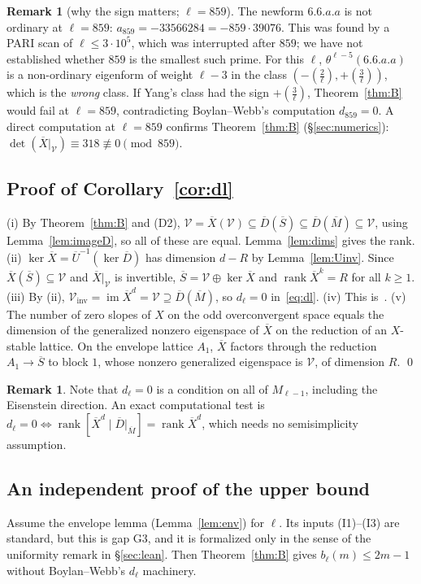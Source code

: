 \documentclass[11pt]{amsart}
\newcommand{\Sb}{\overline{S}}
\newcommand{\Mb}{\overline{M}}
\newcommand{\Ub}{\overline{U}}
\newcommand{\Db}{\overline{D}}
\newcommand{\Xb}{\overline{X}}
\newcommand{\cV}{\mathcal{V}}
\newcommand{\leg}[2]{\left(\frac{#1}{#2}\right)}
\DeclareMathOperator{\rank}{rank}
\theoremstyle{plain}
\theoremstyle{definition}
\newtheorem{remark}[theorem]{Remark}
\numberwithin{equation}{section}
\begin{document}
\begin{remark}[why the sign matters; $\ell=859$]\label{rem:859}
The newform $6.6.a.a$ is not ordinary at $\ell=859$: $a_{859}=-33566284=-859\cdot39076$. This was found by a PARI scan of
$\ell\le3\cdot10^5$, which was interrupted after $859$; we have not established whether $859$ is the smallest such prime.
For this $\ell$, $\theta^{\ell-5}(6.6.a.a)$ is a non-ordinary eigenform of weight $\ell-3$ in the class
$(-\leg2\ell,+\leg3\ell)$, which is the \emph{wrong} class. If Yang's class had the sign $+\leg3\ell$, Theorem~\ref{thm:B} would fail at
$\ell=859$, contradicting Boylan--Webb's computation $d_{859}=0$. A direct computation at $\ell=859$ confirms
Theorem~\ref{thm:B} (\S\ref{sec:numerics}): $\det(\Xb|_\cV)\equiv318\not\equiv0\pmod{859}$.
\end{remark}

\subsection{Proof of Corollary~\ref{cor:dl}}
(i) By Theorem~\ref{thm:B} and (D2), $\cV=\Xb(\cV)\subseteq\Db(\Sb)\subseteq\Db(\Mb)\subseteq\cV$, using
Lemma~\ref{lem:imageD}, so all of these are equal. Lemma~\ref{lem:dims} gives the rank.
(ii) $\ker\Xb=\Ub^{-1}(\ker\Db)$ has dimension $d-R$ by Lemma~\ref{lem:Uinv}. Since $\Xb(\Sb)\subseteq\cV$ and
$\Xb|_\cV$ is invertible, $\Sb=\cV\oplus\ker\Xb$ and $\rank\Xb^k=R$ for all $k\ge1$.
(iii) By (ii), $\cV_{\mathrm{inv}}=\operatorname{im}\Xb^d=\cV\supseteq\Db(\Mb)$, so $d_\ell=0$ in~\eqref{eq:dl}.
(iv) This is~\cite[Thm.~1.2]{BoylanWebb2013}.
(v) The number of zero slopes of $X$ on the odd overconvergent space equals the dimension of the generalized nonzero
eigenspace of $\Xb$ on the reduction of an $X$-stable lattice. On the envelope lattice $A_1$, $\Xb$ factors through the
reduction $A_1\to\Sb$ to block $1$, whose nonzero generalized eigenspace is $\cV$, of dimension $R$. \qed

\begin{remark}
Note that $d_\ell=0$ is a condition on all of $M_{\ell-1}$, including the Eisenstein direction. An exact computational test is
$d_\ell=0\iff\rank[\Xb^d\mid\Db|_{\Mb}]=\rank\Xb^d$, which needs no semisimplicity assumption.
\end{remark}

\subsection{An independent proof of the upper bound}\label{sec:upper}
Assume the envelope lemma (Lemma~\ref{lem:env}) for $\ell$. Its inputs (I1)--(I3) are standard, but this is gap G3, and
it is formalized only in the sense of the uniformity remark in \S\ref{sec:lean}. Then Theorem~\ref{thm:B} gives
$b_\ell(m)\le2m-1$ without Boylan--Webb's $d_\ell$ machinery.
\end{document}
